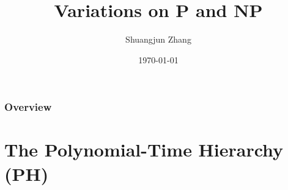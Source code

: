 \documentclass{beamer}
\title[Short title]{Variations on P and NP} %
\author{Shuangjun Zhang} %
\institute[FDU] %
{
Fudan University \\ %
\medskip
\textit{zhangsj17@fudan.edu.cn} %
}
\date{\today} %
\begin{document}
\begin{frame}
\titlepage %
\end{frame}

\begin{frame}
\frametitle{Overview} %
\tableofcontents %
\end{frame}


\section{The Polynomial-Time Hierarchy (PH)}
\end{document}

